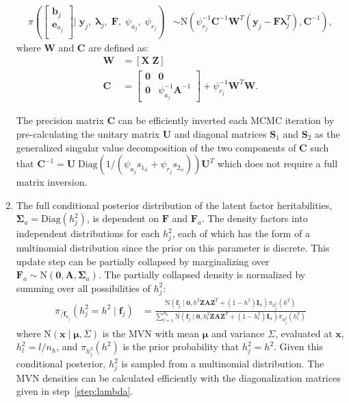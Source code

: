 \documentclass[12pt,titlepage]{article}
\newcommand{\bm}{\mathbf}
\begin{document}
\begin{enumerate}
\begin{align*}
\pi\left(\left[\begin{array}{c}
  \mathbf{b}_j \\ 
  \mathbf{e}_{a_j} \\ 
\end{array}\right] \big|\; \mathbf{y}_j, \; \pmb{\lambda}_j,\; \mathbf{F},\;  \psi_{a_j}, \; \psi_{r_j} \right) &\sim \mbox{N}\left(\psi^{-1}_{r_j}\mathbf{C}^{-1}\mathbf{W}^T(\mathbf{y}_j - \mathbf{F}\pmb{\lambda}^T_j),\mathbf{C}^{-1}\right),
\end{align*}
\noindent where $\mathbf{W}$ and $\mathbf{C}$ are defined as:
\begin{align*}
\mathbf{W} &= [\mathbf{X}\; \mathbf{Z} ] \\
\mathbf{C} &= 
\left[\begin{array}{ccc}
 \mathbf{0} &  \mathbf{0} \\
  \mathbf{0}  & \psi^{-1}_{a_j} \mathbf{A}^{-1} 
\end{array}\right]  + \psi^{-1}_{r_j}\mathbf{W}^T\mathbf{W}.
\end{align*}

The precision matrix $\mathbf{C}$ can be efficiently inverted each MCMC iteration by pre-calculating the unitary matrix $\mathbf{U}$ and diagonal matrices $\mathbf{S}_1$ and $\mathbf{S}_2$ as the generalized singular value decomposition of the two components of $\mathbf{C}$ such that $\mathbf{C}^{-1} = \mathbf{U}\;\mbox{Diag}(1/(\psi_{a_j} s_{1_{ii}} + \psi_{r_j} s_{2_{ii}})) \mathbf{U}^T$ which does not require a full matrix inversion.

\item The full conditional posterior distribution of the latent factor heritabilities, $\mathbf{\Sigma}_a = \mbox{Diag}(h^2_j)$, is dependent on $\mathbf{F}$ and $\mathbf{F}_a$. The density factors into independent distributions for each $h^2_j$, each of which has the form of a multinomial distribution since the prior on this parameter is discrete. This update step can be partially collapsed by marginalizing over $\mathbf{F}_a \sim \mbox{N}(\mathbf{0},\mathbf{A},\mathbf{\Sigma}_a)$. The partially collapsed density is normalized by summing over all possibilities of $h^2_j$:
\begin{align*}
\pi_{/\mathbf{f}_{a_j}}\left(h^2_j = h^2 \mid \mathbf{f}_j \right) &= \frac{\mbox{N}\left(\mathbf{f}_j \mid \mathbf{0}, h^2\mathbf{Z}\mathbf{A}\mathbf{Z}^T + (1-h^2) \mathbf{I}_n\right) \pi_{h^2_j}(h^2)}{\sum\limits_{l=1}^{n_h}\mbox{N}\left(\mathbf{f}_j \mid \mathbf{0}, h^2_l\mathbf{Z}\mathbf{A}\mathbf{Z}^T + (1-h^2_l) \mathbf{I}_n\right) \pi_{h^2_j}(h^2_l)}
\end{align*}
\noindent where $\mbox{N}(\mathbf{x}\mid \bm \mu,\Sigma)$ is the MVN with mean $\bm \mu$ and variance $\Sigma$, evaluated at $\mathbf{x}$, $h^2_l = l/n_h$, and $\pi_{h^2_j}(h^2)$ is the prior probability that $h^2_j = h^2$. Given this conditional posterior, $h^2_j$ is sampled from a multinomial distribution. The MVN densities can be calculated efficiently with the diagonalization matrices given in step~\ref{step:lambda}.



\end{enumerate}
\end{document}
